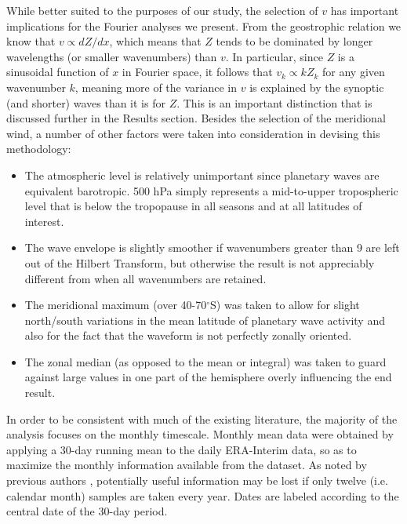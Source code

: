 While better suited to the purposes of our study, the selection of $v$ has important implications for the Fourier analyses we present. From the geostrophic relation we know that $v \propto dZ / dx$, which means that $Z$ tends to be dominated by longer wavelengths (or smaller wavenumbers) than $v$. In particular, since $Z$ is a sinusoidal function of $x$ in Fourier space, it follows that $v_k \propto k Z_k$ for any given wavenumber $k$, meaning more of the variance in $v$ is explained by the synoptic (and shorter) waves than it is for $Z$. This is an important distinction that is discussed further in the Results section. Besides the selection of the meridional wind, a number of other factors were taken into consideration in devising this methodology:
\begin{itemize}
\item The atmospheric level is relatively unimportant since planetary waves are equivalent barotropic. 500 hPa simply represents a mid-to-upper tropospheric level that is below the tropopause in all seasons and at all latitudes of interest.
\item The wave envelope is slightly smoother if wavenumbers greater than 9 are left out of the Hilbert Transform, but otherwise the result is not appreciably different from when all wavenumbers are retained.
\item The meridional maximum (over 40-70$^{\circ}$S) was taken to allow for slight north/south variations in the mean latitude of planetary wave activity and also for the fact that the waveform is not perfectly zonally oriented. 
\item The zonal median (as opposed to the mean or integral) was taken to guard against large values in one part of the hemisphere overly influencing the end result.
\end{itemize}

In order to be consistent with much of the existing literature, the majority of the analysis focuses on the monthly timescale. Monthly mean data were obtained by applying a 30-day running mean to the daily ERA-Interim data, so as to maximize the monthly information available from the dataset. As noted by previous authors \citep[e.g.][]{Kidson1988}, potentially useful information may be lost if only twelve (i.e. calendar month) samples are taken every year. Dates are labeled according to the central date of the 30-day period.   